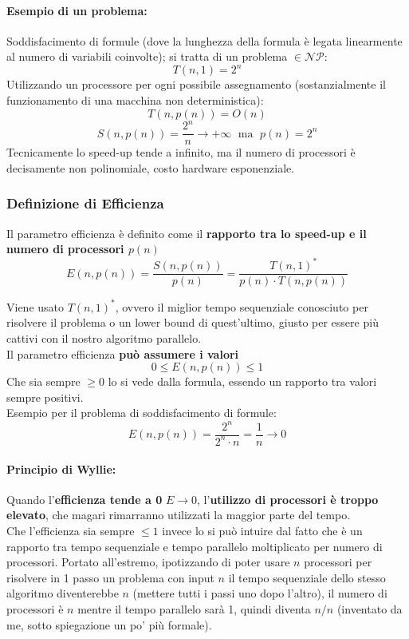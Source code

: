 \documentclass[11pt]{article}
\begin{document}
	\paragraph{Esempio di un problema:} Soddisfacimento di formule (dove la lunghezza della formula è legata linearmente al numero di variabili coinvolte); si tratta di un problema $\in \mathcal{NP}$:
	$$ T(n,1) = 2^n$$
	Utilizzando un processore per ogni possibile assegnamento (sostanzialmente il funzionamento di una macchina non deterministica): 
	$$ T(n, p(n)) = O(n) $$
	$$S(n, p(n)) = \frac{2^n}{n} \rightarrow +\infty \;\text{ ma }\; p(n) = 2^n$$
	Tecnicamente lo speed-up tende a infinito, ma il numero di processori è decisamente non polinomiale, costo hardware esponenziale.
	
	\newpage
	
	\subsubsection{Definizione di Efficienza}
	Il parametro efficienza è definito come il \textbf{rapporto tra lo speed-up e il numero di processori $p(n)$}
	$$ E(n, p(n)) = \frac{S(n,p(n))}{p(n)} = \frac{T(n,1)^\ast}{p(n) \cdot T(n, p(n))}$$
	
	Viene usato $T(n,1)^\ast$, ovvero il miglior tempo sequenziale conosciuto per risolvere il problema o un lower bound di quest'ultimo, giusto per essere più cattivi con il nostro algoritmo parallelo.\\
	
	Il parametro efficienza \textbf{può assumere i valori}
	$$ 0 \leq E(n, p(n)) \leq 1$$
	Che sia sempre $\geq 0$ lo si vede dalla formula, essendo un rapporto tra valori sempre positivi.\\
	
	Esempio per il problema di soddisfacimento di formule:
	$$ E(n, p(n)) = \frac{2^n}{2^n \cdot n} = \frac{1}{n} \rightarrow 0 $$
	
	\paragraph{Principio di Wyllie:} Quando l'\textbf{efficienza tende a 0} $E \rightarrow 0$, l'\textbf{utilizzo di processori è troppo elevato}, che magari rimarranno utilizzati la maggior parte del tempo.\\
	
	Che l'efficienza sia sempre $\leq 1$ invece lo si può intuire dal fatto che è un rapporto tra tempo sequenziale e tempo parallelo moltiplicato per numero di processori. Portato all'estremo, ipotizzando di poter usare $n$ processori per risolvere in 1 passo un problema con input $n$ il tempo sequenziale dello stesso algoritmo diventerebbe $n$ (mettere tutti i passi uno dopo l'altro), il numero di processori è $n$ mentre il tempo parallelo sarà 1, quindi diventa $n/n$ (inventato da me, sotto spiegazione un po' più formale). \\
	
\end{document}
